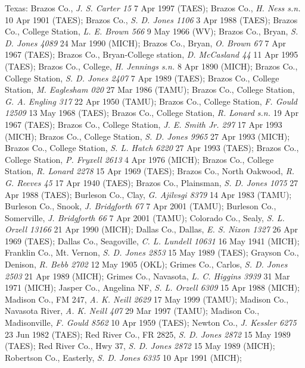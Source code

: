 \documentclass{article}
\begin{document}
Texas:
Brazos Co., \textit{J. S. Carter 15} 7 Apr 1997 (TAES); 
Brazos Co., \textit{H. Ness s.n.} 10 Apr 1901 (TAES); 
Brazos Co., \textit{S. D. Jones 1106} 3 Apr 1988 (TAES); 
Brazos Co., College Station, \textit{L. E. Brown 566} 9 May 1966 (WV); 
Brazos Co., Bryan, \textit{S. D. Jones 4089} 24 Mar 1990 (MICH); 
Brazos Co., Bryan, \textit{O. Brown 67} 7 Apr 1967 (TAES); 
Brazos Co., Bryan-College station, \textit{D. McCasland 44} 11 Apr 1995 (TAES); 
Brazos Co., College, \textit{H. Jennings s.n.} 8 Apr 1890 (MICH); 
Brazos Co., College Station, \textit{S. D. Jones 2407} 7 Apr 1989 (TAES); 
Brazos Co., College Station, \textit{M. Eaglesham 020} 27 Mar 1986 (TAMU); 
Brazos Co., College Station, \textit{G. A. Engling 317} 22 Apr 1950 (TAMU); 
Brazos Co., College Station, \textit{F. Gould 12509} 13 May 1968 (TAES); 
Brazos Co., College Station, \textit{R. Lonard s.n.} 19 Apr 1967 (TAES); 
Brazos Co., College Station, \textit{J. E. Smith Jr. 297} 17 Apr 1993 (MICH); 
Brazos Co., College Station, \textit{S. D. Jones 9965} 27 Apr 1993 (MICH); 
Brazos Co., College Station, \textit{S. L. Hatch 6220} 27 Apr 1993 (TAES); 
Brazos Co., College Station, \textit{P. Fryxell 2613} 4 Apr 1976 (MICH); 
Brazos Co., College Station, \textit{R. Lonard 2278} 15 Apr 1969 (TAES); 
Brazos Co., North Oakwood, \textit{R. G. Reeves 45} 17 Apr 1940 (TAES); 
Brazos Co., Plainsman, \textit{S. D. Jones 1075} 27 Apr 1988 (TAES); 
Burleson Co., Clay, \textit{G. Ajilvsgi 8379} 14 Apr 1983 (TAMU); 
Burleson Co., Snook, \textit{J. Bridgforth 67} 7 Apr 2001 (TAMU); 
Burleson Co., Somerville, \textit{J. Bridgforth 66} 7 Apr 2001 (TAMU); 
Colorado Co., Sealy, \textit{S. L. Orzell 13166} 21 Apr 1990 (MICH); 
Dallas Co., Dallas, \textit{E. S. Nixon 1327} 26 Apr 1969 (TAES); 
Dallas Co., Seagoville, \textit{C. L. Lundell 10631} 16 May 1941 (MICH); 
Franklin Co., Mt. Vernon, \textit{S. D. Jones 2853} 15 May 1989 (TAES); 
Grayson Co., Denison, \textit{R. Bebb 2702} 12 May 1905 (OKL); 
Grimes Co., Carlos, \textit{S. D. Jones 2503} 21 Apr 1989 (MICH); 
Grimes Co., Navasota, \textit{L. C. Higgins 3939} 31 Mar 1971 (MICH); 
Jasper Co., Angelina NF, \textit{S. L. Orzell 6309} 15 Apr 1988 (MICH); 
Madison Co., FM 247, \textit{A. K. Neill 2629} 17 May 1999 (TAMU); 
Madison Co., Navasota River, \textit{A. K. Neill 407} 29 Mar 1997 (TAMU); 
Madison Co., Madisonville, \textit{F. Gould 8562} 10 Apr 1959 (TAES); 
Newton Co., \textit{J. Kessler 6275} 23 Jun 1982 (TAES); 
Red River Co., FR 2825, \textit{S. D. Jones 2872} 15 May 1989 (TAES); 
Red River Co., Hwy 37, \textit{S. D. Jones 2872} 15 May 1989 (MICH); 
Robertson Co., Easterly, \textit{S. D. Jones 6335} 10 Apr 1991 (MICH); 
\end{document}
